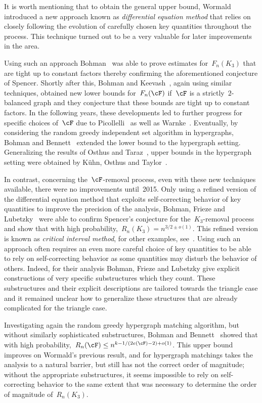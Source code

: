 \documentclass[11pt]{amsart}
\theoremstyle{definition}
\numberwithin{equation}{section}
\begin{document}
	It is worth mentioning that to obtain the general upper bound, Wormald introduced a new approach known as \emph{differential equation method} that relies on closely following the evolution of carefully chosen key quantities throughout the process. This technique turned out to be a very valuable for later improvements in the area.
	
	Using such an approach Bohman~\cite{B:09} was able to prove estimates for~$F_n(K_3)$ that are tight up to constant factors thereby confirming the aforementioned conjecture of Spencer.
	Shortly after this, Bohman and Keevash~\cite{BK:10}, again using similar techniques, obtained new lower bounds for~$F_n(\cF)$  if~$\cF$ is a strictly~$2$-balanced graph and they conjecture that these bounds are tight up to constant factors.
	In the following years, these developments led to further progress for specific choices of~$\cF$ due to Picollelli~\cite{P:11,P:14a,P:14b} as well as Warnke~\cite{W:14a,W:14b}.
	Eventually, by considering the random greedy independent set algorithm in hypergraphs, Bohman and Bennett~\cite{BB:16} extended the lower bound to the hypergraph setting.
	Generalizing the results of Osthus and Taraz~\cite{OT:01}, upper bounds in the hypergraph setting were obtained by K\"uhn, Osthus and Taylor~\cite{KOT:16}.
	
	In contrast, concerning the~$\cF$-removal process, even with these new techniques available, there were no improvements until~2015.
	Only using a refined version of the differential equation method that exploits self-correcting behavior of key quantities to improve the precision of the analysis, Bohman, Frieze and Lubetzky~\cite{BFL:15} were able to confirm Spencer's conjecture for the~$K_3$-removal process and show that with high probability,~$R_n(K_3)=n^{3/2\pm o(1)}$.
	This refined version is known as \emph{critical interval method}, for other examples, see~\cite{BFL:18,BK:21,BP:12,PGM:20,H:24,TWZ:07}. 
	Using such an approach often requires an even more careful choice of key quantities to be able to rely on self-correcting behavior as some quantities may disturb the behavior of others.
	Indeed, for their analysis Bohman, Frieze and Lubetzky give explicit constructions of very specific substructures which they count.
	These substructures and their explicit descriptions are tailored towards the triangle case and it remained unclear how to generalize these structures that are already complicated for the triangle case.
	
	Investigating again the random greedy hypergraph matching algorithm, but without similarly sophisticated substructures, Bohman and Bennett~\cite{BB:19} showed that with high probability,~$R_n(\cF)\leq n^{k-1/(2e(\cF)-2)+o(1)}$.
	This upper bound improves on Wormald's previous result, and for hypergraph matchings takes the analysis to a natural barrier, but still has not the correct order of magnitude; without the appropriate substructures, it seems impossible to rely on self-correcting behavior to the same extent that was necessary to determine the order of magnitude of~$R_n(K_3)$.
	
\end{document}
